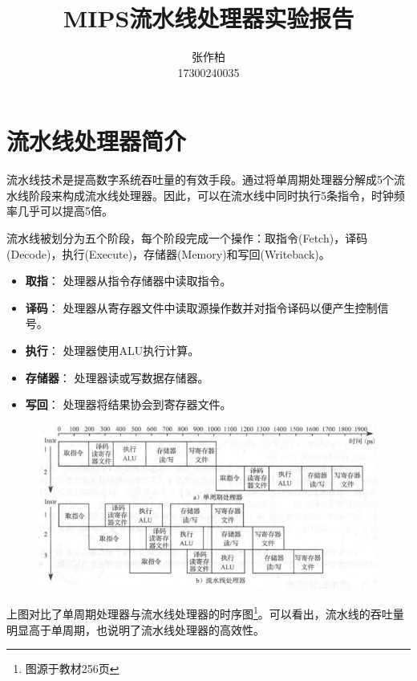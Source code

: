 \documentclass[12pt]{article} %
\title{\textbf{MIPS流水线处理器实验报告}}
\author{张作柏\\17300240035}
\begin{document}
\begin{sloppypar}
\maketitle

\pagestyle{fancy}
\lhead{\textbf{{\thetitle}}}
\rhead{\textbf{\nouppercase{\firstleftmark}}}
\cfoot{\thepage}

\thispagestyle{empty}
\tableofcontents
\clearpage

\setcounter{page}{1}

\section{流水线处理器简介}

流水线技术是提高数字系统吞吐量的有效手段。通过将单周期处理器分解成5个流水线阶段来构成流水线处理器。因此，可以在流水线中同时执行5条指令，时钟频率几乎可以提高5倍。

流水线被划分为五个阶段，每个阶段完成一个操作：取指令(Fetch)，译码(Decode)，执行(Execute)，存储器(Memory)和写回(Writeback)。
\begin{itemize}
\item {\bf 取指}： 处理器从指令存储器中读取指令。
\item {\bf 译码}： 处理器从寄存器文件中读取源操作数并对指令译码以便产生控制信号。
\item {\bf 执行}： 处理器使用ALU执行计算。
\item {\bf 存储器}： 处理器读或写数据存储器。
\item {\bf 写回}： 处理器将结果协会到寄存器文件。
\end{itemize}

\begin{figure}[h]
\centering
\includegraphics[width =0.95\linewidth]{figure/timestep.png}
\end{figure}

上图对比了单周期处理器与流水线处理器的时序图\footnote{图源于教材256页}。可以看出，流水线的吞吐量明显高于单周期，也说明了流水线处理器的高效性。


\end{sloppypar}
\end{document}
